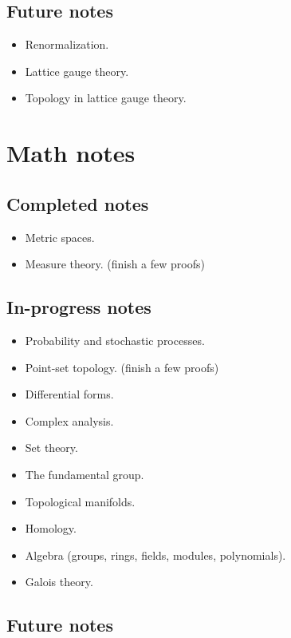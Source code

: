 \subsection{Future notes}

\begin{itemize}
	\item Renormalization.
	\item Lattice gauge theory.
	\item Topology in lattice gauge theory.
\end{itemize}

\section{Math notes}

\subsection{Completed notes}

\begin{itemize}
	\item Metric spaces.
	\item Measure theory. (finish a few proofs)
\end{itemize}

\subsection{In-progress notes}

\begin{itemize}
	\item Probability and stochastic processes.
	\item Point-set topology. (finish a few proofs)
	\item Differential forms.
	\item Complex analysis.
	\item Set theory.
	\item The fundamental group.
	\item Topological manifolds.
	\item Homology.
	\item Algebra (groups, rings, fields, modules, polynomials).
	\item Galois theory.
\end{itemize}

\subsection{Future notes}

